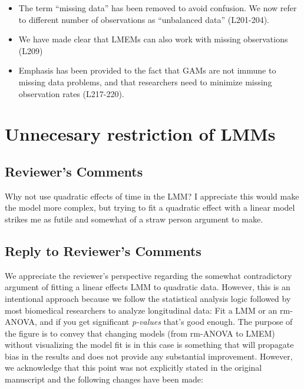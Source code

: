 \documentclass[
]{article}
\begin{document}
\begin{itemize}
\item
  The term ``missing data'' has been removed to avoid confusion. We now refer to different number of observations as ``unbalanced data'' (L201-204).
\item
  We have made clear that LMEMs can also work with missing observations (L209)
\item
  Emphasis has been provided to the fact that GAMs are not immune to missing data problems, and that researchers need to minimize missing observation rates (L217-220).
\end{itemize}

\hypertarget{unnecesary-restriction-of-lmms}{%
\section{Unnecesary restriction of LMMs}\label{unnecesary-restriction-of-lmms}}

\hypertarget{reviewers-comments-1}{%
\subsection{Reviewer's Comments}\label{reviewers-comments-1}}

Why not use quadratic effects of time in the LMM? I appreciate this would make the model more complex, but trying to fit a quadratic effect with a linear model strikes me as futile and somewhat of a straw person argument to make.

\hypertarget{section-2}{%
\subsection{\texorpdfstring{\textcolor{reviewersblue} {Reply to Reviewer's Comments}}{}}\label{section-2}}

We appreciate the reviewer's perspective regarding the somewhat contradictory argument of fitting a linear effects LMM to quadratic data. However, this is an intentional approach because we follow the statistical analysis logic followed by most biomedical researchers to analyze longitudinal data: Fit a LMM or an rm-ANOVA, and if you get significant \emph{p-values} that's good enough. The purpose of the figure is to convey that changing models (from rm-ANOVA to LMEM) without visualizing the model fit is in this case is something that will propagate bias in the results and does not provide any substantial improvement. However, we acknowledge that this point was not explicitly stated in the original manuscript and the following changes have been made:
\end{document}
